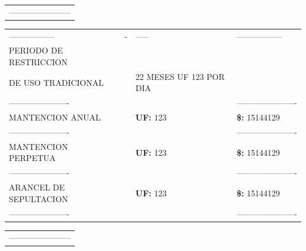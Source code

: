 \documentclass[10pt]{article}
\begin{document}
\begin{tabular}{l}
\color{white}----------------------- \\
\end{tabular}

\begin{tabular}{llll}
\hline
\color{white}----------------- & \color{white}- & \color{white}-----  & \color{white}----------------- \\
PERIODO DE RESTRICCION & & &\\ 
DE USO TRADICIONAL  & & 22 MESES UF 123 POR DIA \\ 
\color{white}---------------------- & & & \color{white}---------------------- \\
MANTENCION ANUAL &  & \textbf{UF: }123& \textbf{\$: }15144129 \\  
\color{white}---------------------- & & & \color{white}---------------------- \\
MANTENCION PERPETUA &  & \textbf{UF: }123 & \textbf{\$: }15144129 \\  
\color{white}---------------------- & & & \color{white}---------------------- \\
ARANCEL DE SEPULTACION &  & \textbf{UF: } 123& \textbf{\$: } 15144129 \\  
\color{white}---------------------- & & & \color{white}---------------------- \\
\hline
\end{tabular}

\begin{tabular}{l}
\color{white}----------------------- \\
\end{tabular}
\end{document}
